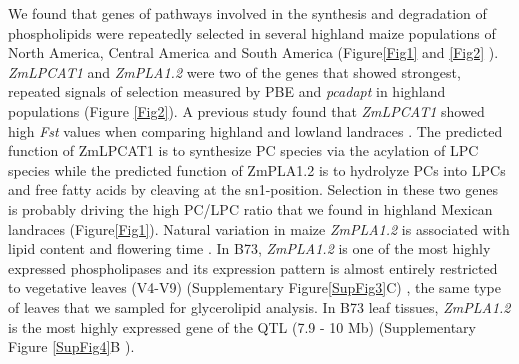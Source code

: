 \documentclass[9pt,twocolumn,twoside,lineno]{BioRxiv}
\begin{document}
We found that genes of pathways involved in the synthesis and degradation of phospholipids were repeatedly selected in several highland maize populations of North America, Central America and South America (Figure\ref{Fig1} and \ref{Fig2} ). 
\textit{ZmLPCAT1} and \textit{ZmPLA1.2} were two of the genes that showed strongest, repeated signals of selection measured by PBE and \textit{pcadapt} in highland populations (Figure \ref{Fig2}). 
A previous study found that \textit{ZmLPCAT1} showed high \textit{Fst} values when comparing highland and lowland landraces \cite{Takuno2015-uj}.
The predicted function of ZmLPCAT1 is to synthesize PC species via the acylation of LPC species while the predicted function of ZmPLA1.2 is to hydrolyze PCs into LPCs and free fatty acids by cleaving at the sn1-position.
Selection in these two genes is probably driving the high PC/LPC ratio that we found in highland Mexican landraces (Figure\ref{Fig1}).
Natural variation in maize \textit{ZmPLA1.2} is associated with lipid content \cite{Riedelsheimer2012-bx} and flowering time \cite{Chen2012-gg, Hung2012-ms}. 
In B73, \textit{ZmPLA1.2} is one of the most highly expressed phospholipases and its expression pattern is almost entirely restricted to vegetative leaves (V4-V9) (Supplementary Figure\ref{SupFig3}C) \cite{Stelpflug2016-vr}, the same type of leaves that we sampled for glycerolipid analysis. 
In B73 leaf tissues, \textit{ZmPLA1.2} is the most highly expressed gene of the QTL (7.9 - 10 Mb) (Supplementary Figure \ref{SupFig4}B \cite{Stelpflug2016-vr}).
\end{document}
